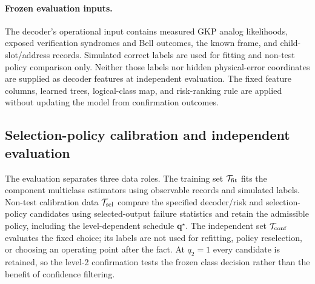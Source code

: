 \documentclass[aps,
prx,
superscriptaddress,
reprint,
longbibliography,
floatfix]{revtex4-2}
\begin{document}
\paragraph*{Frozen evaluation inputs.}
The decoder's operational input contains measured GKP analog likelihoods, exposed verification syndromes and Bell outcomes, the known frame, and child-slot/address records. Simulated correct labels are used for fitting and non-test policy comparison only. Neither those labels nor hidden physical-error coordinates are supplied as decoder features at independent evaluation. The fixed feature columns, learned trees, logical-class map, and risk-ranking rule are applied without updating the model from confirmation outcomes.


\subsection{Selection-policy calibration and independent evaluation}\label{app:decoder_policy_calibration}
The evaluation separates three data roles. The training set $\mathcal T_{\rm fit}$ fits the component multiclass estimators using observable records and simulated labels. Non-test calibration data $\mathcal T_{\rm sel}$ compare the specified decoder/risk and selection-policy candidates using selected-output failure statistics and retain the admissible policy, including the level-dependent schedule $\mathbf q^\star$. The independent set $\mathcal T_{\rm conf}$ evaluates the fixed choice; its labels are not used for refitting, policy reselection, or choosing an operating point after the fact. At $q_2=1$ every candidate is retained, so the level-2 confirmation tests the frozen class decision rather than the benefit of confidence filtering.
\end{document}
